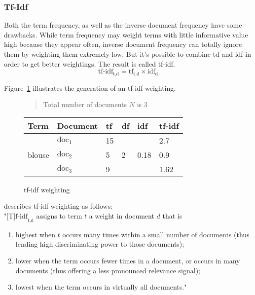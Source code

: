 \subsubsection{Tf-Idf}
\label{sec:tfidf}
Both the term frequency, as well as the inverse document frequency have some drawbacks.
While term frequency may weight terms with little informative value high because they appear often, inverse document frequency can totally ignore them by weighting them extremely low.
But it's possible to combine td and idf in order to get better weightings.
The result is called tf-idf.\citep[p.~118-119]{manning:2009}
\begin{equation}
    \text{tf-idf}_{\text{t,d}} = \text{tf}_\text{t,d} \times \text{idf}_\text{d}
\end{equation}

\noindent
Figure~\ref{fig:tfidfweighting} illustrates the generation of an tf-idf weighting.
\begin{figure}[h]

    \begin{quote}
        Total number of documents $N$ is 3\\
    \end{quote}

    \center
    \begin{tabular}{ l l | l l l l }
        \rowcolor{\dustRowColourHead}
        Term                    & Document          & tf    & df& idf   & tf-idf\\\hline
        \multirow{3}{*}{blouse} & $\text{doc}_1$    & 15    &  \multirow{3}{*}{2}   & \multirow{3}{*}{0.18}     & 2.7\\
                                & $\text{doc}_2$    & 5     &                       &                           & 0.9\\
                                & $\text{doc}_3$    & 9     &                       &                           & 1.62\\
    \end{tabular}
    \caption{tf-idf weighting}
    \label{fig:tfidfweighting}
\end{figure}

\noindent
\citeauthor{manning:2009} describes tf-idf weighting as follows:\\
"$\text{[T]f-idf}_{\text{t,d}}$ assigns to term $t$ a weight in document $d$ that is
\begin{enumerate}
    \item highest when $t$ occurs many times within a small number of documents
    (thus lending high discriminating power to those documents);
    \item lower when the term occurs fewer times in a document, or occurs in many
    documents (thus offering a less pronounced relevance signal);
    \item lowest when the term occurs in virtually all documents."
\end{enumerate}
\citep[p.~119]{manning:2009}

